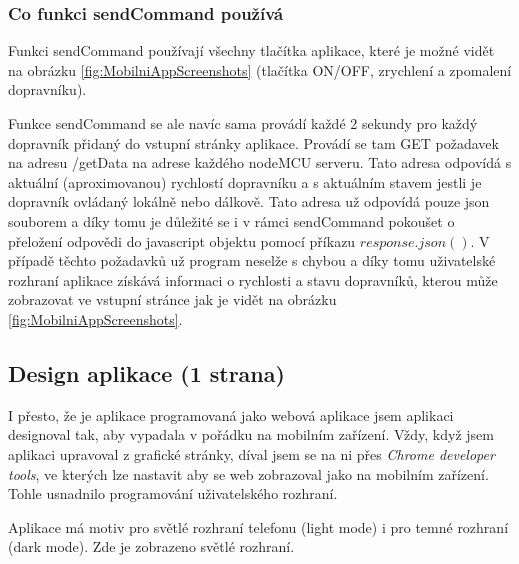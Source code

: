 \subsubsection{Co funkci sendCommand používá}

Funkci sendCommand používají všechny tlačítka aplikace, které je možné vidět na obrázku \ref{fig:MobilniAppScreenshots} (tlačítka ON/OFF, zrychlení a zpomalení dopravníku). 

Funkce sendCommand se ale navíc sama provádí každé 2 sekundy pro každý dopravník přidaný do vstupní stránky aplikace. Provádí se tam GET požadavek na adresu /getData na adrese každého nodeMCU serveru. Tato adresa odpovídá s aktuální (aproximovanou) rychlostí dopravníku a s aktuálním stavem jestli je dopravník ovládaný lokálně nebo dálkově. Tato adresa už odpovídá pouze json souborem a díky tomu je důležité se i v rámci sendCommand pokoušet o přeložení odpovědi do javascript objektu pomocí příkazu $response.json()$. V případě těchto požadavků už program neselže s chybou a díky tomu uživatelské rozhraní aplikace získává informaci o rychlosti a stavu dopravníků, kterou může zobrazovat ve vstupní stránce jak je vidět na obrázku \ref{fig:MobilniAppScreenshots}.

\subsection{Design aplikace (1 strana)}

I přesto, že je aplikace programovaná jako webová aplikace jsem aplikaci designoval tak, aby vypadala v pořádku na mobilním zařízení. Vždy, když jsem aplikaci upravoval z grafické stránky, díval jsem se na ni přes \textit{Chrome developer tools}, ve kterých lze nastavit aby se web zobrazoval jako na mobilním zařízení. Tohle usnadnilo programování uživatelského rozhraní.

Aplikace má motiv pro světlé rozhraní telefonu (light mode) i pro temné rozhraní (dark mode). Zde je zobrazeno světlé rozhraní.

